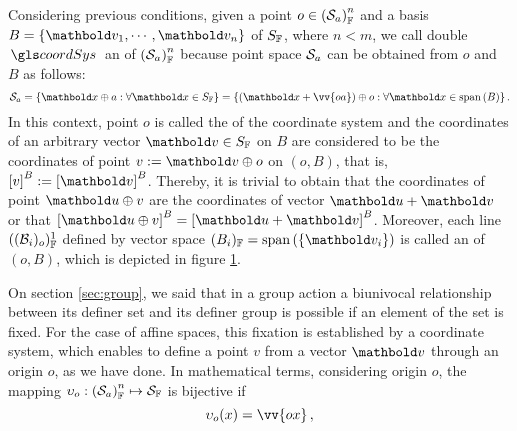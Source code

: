  Considering previous conditions, given a point $o\in\eamsd{S}{F}{a}{n}$ and a basis $B=\{\vto{v}_1,\cdots,\vto{v}_n\}$ of $S_\cam{F}$, where $n<m$, we call double $\gloref{coordSys}$ an  of $\eamsd{S}{F}{a}{n}$ because point space $\epu{S}_a$ can be obtained from $o$ and $B$ as follows:
\begin{equation}\label{eq:pointSpace}
\epu{S}_a=\{\vto{x}\oplus a:\forall \vto{x}\in S_\cam{F}\}= \{(\vto{x}+\vv{oa})\oplus o:\forall \vto{x}\in \spn{(B)}\}\,.
\end{equation}
In this context, point $o$ is called the  of the coordinate system and the coordinates of an arbitrary vector $\vto{v}\in S_\cam{F}$ on $B$ are considered to be the coordinates of point $v:=\vto{v}\oplus o$ on $(o,B)$, that is, $\mav{v}{B}:=\mav{\vto{v}}{B}$. Thereby, it is trivial to obtain that the coordinates of point $\vto{u}\oplus v$ are the coordinates of vector $\vto{u}+\vto{v}$ or that $\mav{\vto{u}\oplus v}{B}=\mav{\vto{u}+\vto{v}}{B}$. Moreover, each line $((\mathcal{B}_i)_o)^1_\cam{F}$ defined by vector space $(B_i)_\cam{F}=\spn{(\{\vto{v}_i\})}$ is called an  of $(o,B)$, which is depicted in figure \ref{fg:coordSystem}.
\begin{figure}[!ht]
	\centering
	\begin{center}
		\scalebox{.72}{}
	\end{center}
	\label{fg:coordSystem}
\end{figure}
On section \ref{sec:group}, we said that in a group action a biunivocal relationship between its definer set and its definer group is possible if an element of the set is fixed. For the case of affine spaces, this fixation is established by a coordinate system, which enables to define a point $v$ from a vector $\vto{v}$ through an origin $o$, as we have done. In mathematical terms, considering origin $o$, the mapping $\map{\upsilon_o}{\eamsd{S}{F}{a}{n}}{\eam{S}{F}}$ is bijective if 
\begin{equation}\label{eq:funVect}
\fua{\upsilon_o}{x} = \vv{ox}\,,
\end{equation} 
